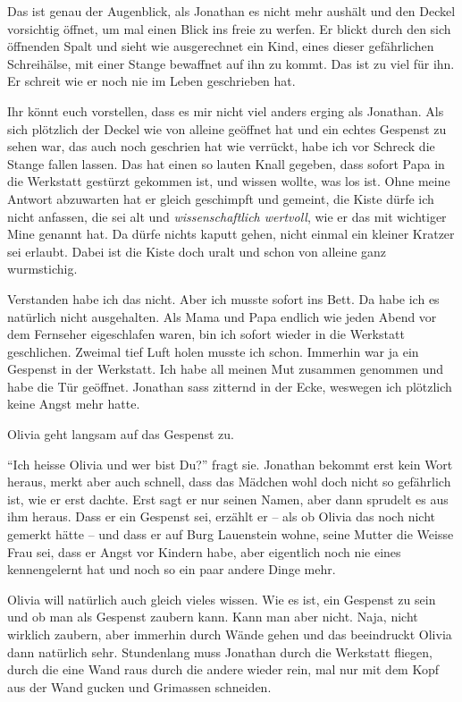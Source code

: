 Das ist genau der Augenblick, als Jonathan es nicht mehr aushält und den Deckel vorsichtig öffnet, um mal einen Blick ins freie zu werfen. Er blickt durch den sich öffnenden Spalt und sieht wie ausgerechnet ein Kind, eines dieser gefährlichen Schreihälse, mit einer Stange bewaffnet auf ihn zu kommt. Das ist zu viel für ihn. Er schreit wie er noch nie im Leben geschrieben hat.
\medskip
\begin{mdframed}[style=mystyle]
  Ihr könnt euch vorstellen, dass es mir nicht viel anders erging als Jonathan. Als sich plötzlich der Deckel wie von alleine geöffnet hat und ein echtes Gespenst zu sehen war, das auch noch geschrien hat wie verrückt, habe ich vor Schreck die Stange fallen lassen. Das hat einen so lauten Knall gegeben, dass sofort Papa in die Werkstatt gestürzt gekommen ist, und wissen wollte, was los ist. Ohne meine Antwort abzuwarten hat er gleich geschimpft und gemeint, die Kiste dürfe ich nicht anfassen, die sei alt und \textit{wissenschaftlich wertvoll}, wie er das mit wichtiger Mine genannt hat. Da dürfe nichts kaputt gehen, nicht einmal ein kleiner Kratzer sei erlaubt. Dabei ist die Kiste doch uralt und schon von alleine ganz wurmstichig. 
  
Verstanden habe ich das nicht. Aber ich musste sofort ins Bett. Da habe ich es natürlich nicht ausgehalten. Als Mama und Papa endlich wie jeden Abend vor dem Fernseher eigeschlafen waren, bin ich sofort wieder in die Werkstatt geschlichen. Zweimal tief Luft holen musste ich schon. Immerhin war ja ein Gespenst in der Werkstatt. Ich habe all meinen Mut zusammen genommen und habe die Tür geöffnet. Jonathan sass zitternd in der Ecke, weswegen ich plötzlich keine Angst mehr hatte. 
\end{mdframed}\medskip

Olivia geht langsam auf das Gespenst zu. 

\enquote{Ich heisse Olivia und wer bist Du?} fragt sie. Jonathan bekommt erst kein Wort heraus, merkt aber auch schnell, dass das Mädchen wohl doch nicht so gefährlich ist, wie er erst dachte. Erst sagt er nur seinen Namen, aber dann sprudelt es aus ihm heraus. Dass er ein Gespenst sei, erzählt er -- als ob Olivia das noch nicht gemerkt hätte -- und dass er auf Burg Lauenstein wohne, seine Mutter die Weisse Frau sei, dass er Angst vor Kindern habe, aber eigentlich noch nie eines kennengelernt hat und noch so ein paar andere Dinge mehr. 

Olivia will natürlich auch gleich vieles wissen. Wie es ist, ein Gespenst zu sein und ob man als Gespenst zaubern kann. Kann man aber nicht. Naja, nicht wirklich zaubern, aber immerhin durch Wände gehen und das beeindruckt Olivia dann natürlich sehr. Stundenlang muss Jonathan durch die Werkstatt fliegen, durch die eine Wand raus durch die andere wieder rein, mal nur mit dem Kopf aus der Wand gucken und Grimassen schneiden. 

